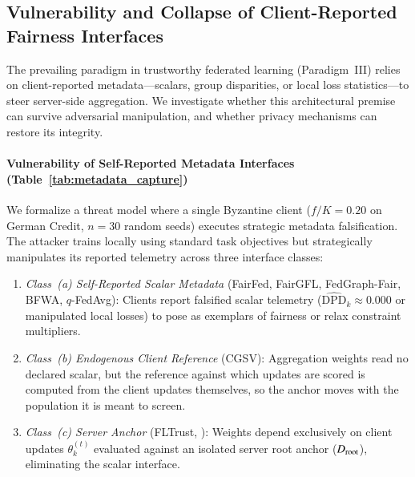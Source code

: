 \subsection{Vulnerability and Collapse of Client-Reported Fairness Interfaces}
\label{subsec:vulnerability}

The prevailing paradigm in trustworthy federated learning (Paradigm~III) relies on client-reported metadata—scalars, group disparities, or local loss statistics—to steer server-side aggregation. We investigate whether this architectural premise can survive adversarial manipulation, and whether privacy mechanisms can restore its integrity.

\paragraph{Vulnerability of Self-Reported Metadata Interfaces (Table~\ref{tab:metadata_capture})}
We formalize a threat model where a single Byzantine client ($f/K = 0.20$ on German Credit, $n=30$ random seeds) executes strategic metadata falsification. The attacker trains locally using standard task objectives but strategically manipulates its reported telemetry across three interface classes:
\begin{enumerate}[leftmargin=*]
    \item \textit{Class~(a) Self-Reported Scalar Metadata} (FairFed, FairGFL, FedGraph-Fair, BFWA, $q$-FedAvg): Clients report falsified scalar telemetry ($\widehat{\text{DPD}}_k \approx 0.000$ or manipulated local losses) to pose as exemplars of fairness or relax constraint multipliers.
    \item \textit{Class~(b) Endogenous Client Reference} (CGSV): Aggregation weights read no declared scalar, but the reference against which updates are scored is computed from the client updates themselves, so the anchor moves with the population it is meant to screen.
    \item \textit{Class~(c) Server Anchor} (FLTrust, \MethodName{}): Weights depend exclusively on client updates $\theta_k^{(t)}$ evaluated against an isolated server root anchor ($D_{\mathrm{root}}$), eliminating the scalar interface.
\end{enumerate}



